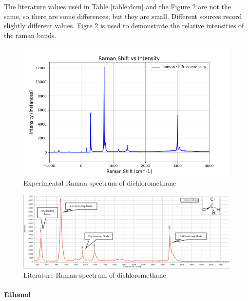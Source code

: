     \bigskip

    The literature values used in Table \ref{table:dcm} and the Figure \ref{fig:dcm_l} are not the same, so there are some differences, but they are small. Different sources record slightly different values. Figre \ref{fig:dcm_l} is used to demonstrate the relative intensities of the raman bands.

    \begin{figure}[h]
        \centering
        \includegraphics[width=\textwidth]{images/raman_spectra/raman_shift_DCM.png}
        \caption{Experimental Raman spectrum of dichloromethane}
        \label{fig:dcm_x}
        \vspace{30pt}
    \end{figure}

    \begin{figure}[h]
        \includegraphics[width=\textwidth]{images/lit_raman/dichloromethane.png}
        \caption{Literature Raman spectrum of dichloromethane \cite{spectrumdcm}}
        \label{fig:dcm_l}
    \end{figure}

    \newpage

\paragraph{Ethanol}

